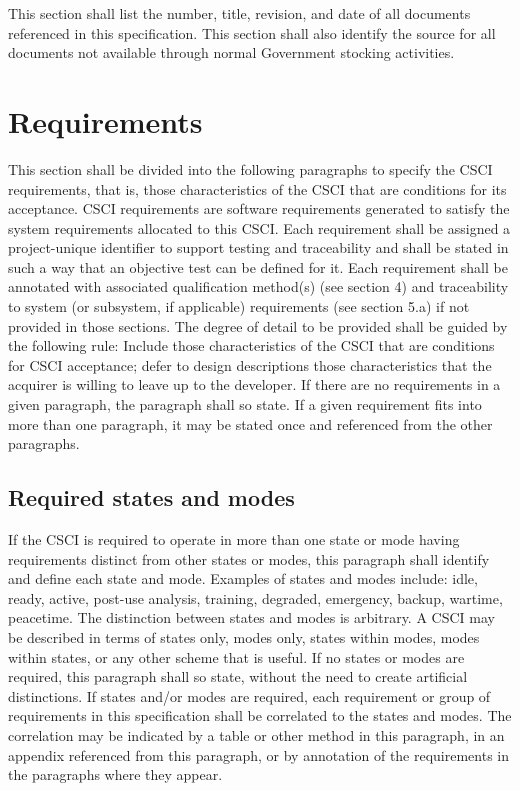 \documentclass{fidata-report-template}
\begin{document}
This section shall list the number, title, revision, and date of all
documents referenced in this specification. This section shall also
identify the source for all documents not available through normal
Government stocking activities.

\section{Requirements}

This section shall be divided into the following paragraphs to specify
the CSCI requirements, that is, those characteristics of the CSCI that
are conditions for its acceptance. CSCI requirements are software
requirements generated to satisfy the system requirements allocated to
this CSCI. Each requirement shall be assigned a project-unique
identifier to support testing and traceability and shall be stated in
such a way that an objective test can be defined for it. Each
requirement shall be annotated with associated qualification method(s)
(see section 4) and traceability to system (or subsystem, if applicable)
requirements (see section 5.a) if not provided in those sections. The
degree of detail to be provided shall be guided by the following rule:
Include those characteristics of the CSCI that are conditions for CSCI
acceptance; defer to design descriptions those characteristics that the
acquirer is willing to leave up to the developer. If there are no
requirements in a given paragraph, the paragraph shall so state. If a
given requirement fits into more than one paragraph, it may be stated
once and referenced from the other paragraphs.

\subsection{Required states and modes}

If the CSCI is required to operate in more than one state or mode having
requirements distinct from other states or modes, this paragraph shall
identify and define each state and mode. Examples of states and modes
include: idle, ready, active, post-use analysis, training, degraded,
emergency, backup, wartime, peacetime. The distinction between states
and modes is arbitrary. A CSCI may be described in terms of states only,
modes only, states within modes, modes within states, or any other
scheme that is useful. If no states or modes are required, this
paragraph shall so state, without the need to create artificial
distinctions. If states and/or modes are required, each requirement or
group of requirements in this specification shall be correlated to the
states and modes. The correlation may be indicated by a table or other
method in this paragraph, in an appendix referenced from this paragraph,
or by annotation of the requirements in the paragraphs where they
appear.
\end{document}
